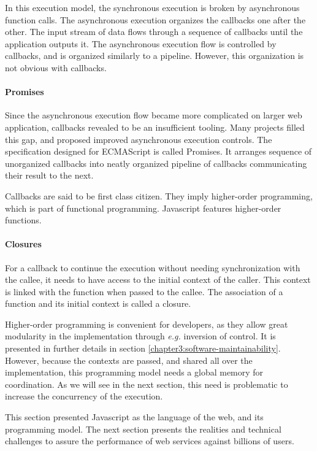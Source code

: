 In this execution model, the synchronous execution is broken by asynchronous function calls.
The asynchronous execution organizes the callbacks one after the other.
The input stream of data flows through a sequence of callbacks until the application outputs it.
The asynchronous execution flow is controlled by callbacks, and is organized similarly to a pipeline.
However, this organization is not obvious with callbacks.

\paragraph{Promises}

Since the asynchronous execution flow became more complicated on larger web application, callbacks revealed to be an insufficient tooling.
Many projects filled this gap, and proposed improved asynchronous execution controls.
The specification designed for ECMAScript is called Promises.
It arranges sequence of unorganized callbacks into neatly organized pipeline of callbacks communicating their result to the next.

Callbacks are said to be first class citizen.
They imply higher-order programming, which is part of functional programming.
Javascript features higher-order functions.

\paragraph{Closures}

For a callback to continue the execution without needing synchronization with the callee, it needs to have access to the initial context of the caller.
This context is linked with the function when passed to the callee.
The association of a function and its initial context is called a closure.

Higher-order programming is convenient for developers, as they allow great modularity in the implementation through \textit{e.g.} inversion of control.
It is presented in further details in section \ref{chapter3:software-maintainability}.
However, because the contexts are passed, and shared all over the implementation, this programming model needs a global memory for coordination.
As we will see in the next section, this need is problematic to increase the concurrency of the execution.

This section presented Javascript as the language of the web, and its programming model.
The next section presents the realities and technical challenges to assure the performance of web services against billions of users.

